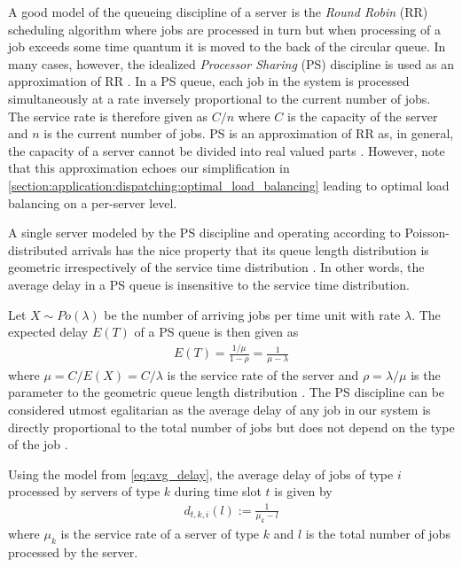 A good model of the queueing discipline of a server is the \emph{Round Robin} (RR) scheduling algorithm where jobs are processed in turn but when processing of a job exceeds some time quantum it is moved to the back of the circular queue. In many cases, however, the idealized \emph{Processor Sharing} (PS) discipline is used as an approximation of RR \cite{Lin2011, Lin2012}. In a PS queue, each job in the system is processed simultaneously at a rate inversely proportional to the current number of jobs. The service rate is therefore given as $C / n$ where $C$ is the capacity of the server and $n$ is the current number of jobs. PS is an approximation of RR as, in general, the capacity of a server cannot be divided into real valued parts \cite{Virtamo2007}. However, note that this approximation echoes our simplification in \autoref{section:application:dispatching:optimal_load_balancing} leading to optimal load balancing on a per-server level.

A single server modeled by the PS discipline and operating according to Poisson-distributed arrivals has the nice property that its queue length distribution is geometric irrespectively of the service time distribution \cite{Aalto2007}. In other words, the average delay in a PS queue is insensitive to the service time distribution.

Let $X \sim Po(\lambda)$ be the number of arriving jobs per time unit with rate $\lambda$. The expected delay $E(T)$ of a PS queue is then given as \begin{align}\label{eq:avg_delay}
    E(T) = \frac{1/\mu}{1-\rho} = \frac{1}{\mu - \lambda}
\end{align} where $\mu = C / E(X) = C / \lambda$ is the service rate of the server and $\rho = \lambda / \mu$ is the parameter to the geometric queue length distribution \cite{Virtamo2007}. The PS discipline can be considered utmost egalitarian as the average delay of any job in our system is directly proportional to the total number of jobs but does not depend on the type of the job \cite{Virtamo2007}.

Using the model from \autoref{eq:avg_delay}, the average delay of jobs of type $i$ processed by servers of type $k$ during time slot $t$ is given by \begin{align*}
    d_{t,k,i}(l) := \frac{1}{\mu_k - l}
\end{align*} where $\mu_k$ is the service rate of a server of type $k$ and $l$ is the total number of jobs processed by the server.


